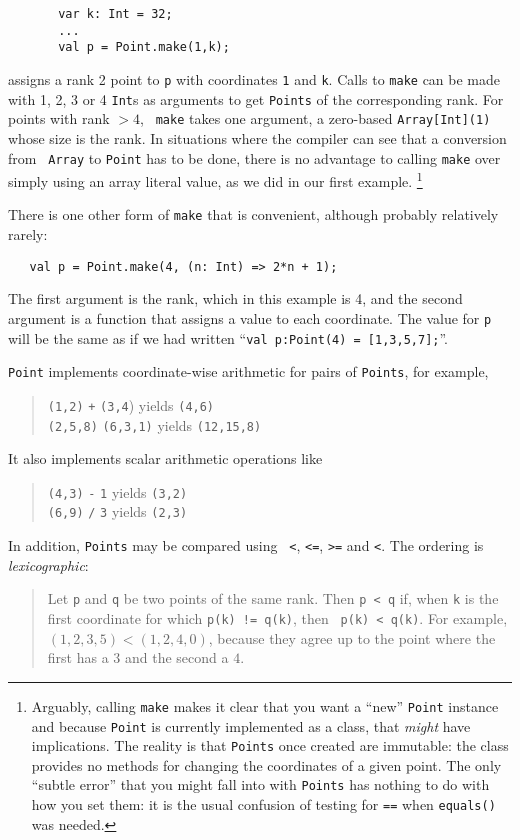 \begin{verbatim}
       var k: Int = 32;
       ...
       val p = Point.make(1,k);
\end{verbatim}
assigns a rank 2 point to {\tt p} with coordinates {\tt 1} and {\tt k}. 
Calls to {\tt make} can be made with 1, 2, 3 or 4 {\tt Int}s as arguments to get
{\tt Points} of the corresponding rank. For points with rank $>4$,  {\tt
make} takes one argument, a zero-based {\tt Array[Int](1)} whose size is the
rank. In situations where the compiler can see that a conversion from {\tt
Array} to {\tt Point} has to be done, there is no advantage to calling {\tt make}
over simply using an array literal value, as we did in our first example.
\footnote{
Arguably, calling {\tt make} makes it clear that you want a ``new'' {\tt Point}
instance and because {\tt Point} is currently implemented as a class, that
{\em might} have implications.  The reality is that {\tt Points} once created
are immutable: the class provides no methods for changing the coordinates
of a given point.  The only ``subtle error'' that you might fall into with 
{\tt Points} has nothing to do with how you set them: it is the
usual confusion of testing for {\tt ==}  when {\tt equals()} was needed.
}

There is one other form of {\tt make} that is convenient, although 
probably relatively rarely:
\begin{verbatim}
   val p = Point.make(4, (n: Int) => 2*n + 1);
\end{verbatim}
The first argument is the rank, which in this example is 4, and the second
argument is a function that assigns a value to each coordinate.  The value for
{\tt p} will be the same as if we had written ``{\tt val p:Point(4) = [1,3,5,7];}''.

{\tt Point} implements coordinate-wise arithmetic for pairs of {\tt Points}, for
example,
\begin{quote}
    {\tt (1,2)} {\tt +} {\tt (3,4}) yields {\tt (4,6)}\\
    {\tt (2,5,8)} {\tt *} {\tt (6,3,1)} yields {\tt (12,15,8)}
\end{quote} 
It also implements scalar arithmetic operations like
\begin{quote}
    {\tt (4,3)} {\tt -} {\tt 1} yields {\tt (3,2)}\\
    {\tt (6,9)} {\tt /} {\tt 3} yields {\tt (2,3)}
\end{quote} 

In addition, {\tt Points} may be compared using  {\tt
<}, {\tt <=}, {\tt >=} and {\tt <}.  The ordering is {\em lexicographic}:
\begin{quote}
Let {\tt p} and {\tt q} be two points of the same rank. Then {\tt p < q} if,
when {\tt k} is the first coordinate for which {\tt p(k) != q(k)}, then {\tt
p(k) < q(k)}.  For example, $(1,2,3,5) < (1,2,4,0)$, because they agree up to
the point where the first has a $3$ and the second a $4$.
\end{quote}

